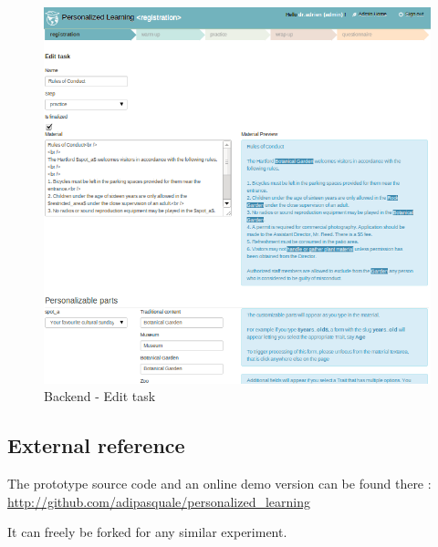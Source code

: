 \documentclass[a4paper,12pt]{article}
\makeatletter
\def\maxwidth{%
  \ifdim\Gin@nat@width>\linewidth
    \linewidth
  \else
    \Gin@nat@width
  \fi
}
\makeatother
\begin{document}
\begin{figure}
\begin{center}
\includegraphics[width=\maxwidth]{edit_task.png}
\caption{Backend - Edit task}
\label{edit_task}
\end{center}
\end{figure}


\subsection{External reference}

The prototype source code and an online demo version can be found there :
\url{http://github.com/adipasquale/personalized_learning}

It can freely be forked for any similar experiment.


\nocite{*}

\end{document}
